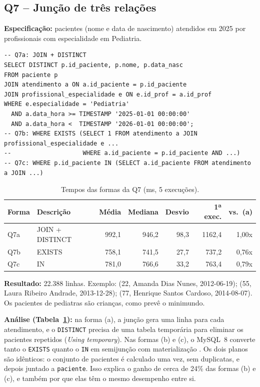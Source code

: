 \documentclass[10pt,a4paper]{article}
\begin{document}
\subsection{Q7 -- Junção de três relações}
\textbf{Especificação:} pacientes (nome e data de nascimento) atendidos em 2025 por profissionais com especialidade em Pediatria.

\begin{lstlisting}
-- Q7a: JOIN + DISTINCT
SELECT DISTINCT p.id_paciente, p.nome, p.data_nasc
FROM paciente p
JOIN atendimento a ON a.id_paciente = p.id_paciente
JOIN profissional_especialidade e ON e.id_prof = a.id_prof
WHERE e.especialidade = 'Pediatria'
  AND a.data_hora >= TIMESTAMP '2025-01-01 00:00:00'
  AND a.data_hora <  TIMESTAMP '2026-01-01 00:00:00';
-- Q7b: WHERE EXISTS (SELECT 1 FROM atendimento a JOIN profissional_especialidade e ...
--                    WHERE a.id_paciente = p.id_paciente AND ...)
-- Q7c: WHERE p.id_paciente IN (SELECT a.id_paciente FROM atendimento a JOIN ...)
\end{lstlisting}

\begin{table}[H]\centering\footnotesize
\caption{Tempos das formas da Q7 (ms, 5 execuções).}\label{tab:q7}
\begin{tabular}{llrrrrr}\toprule
Forma & Descrição & Média & Mediana & Desvio & 1ª exec. & vs.\ (a) \\ \midrule
Q7a & JOIN + DISTINCT  & 992,1 & 946,2 & 98,3 & 1162,4 & 1,00x \\
Q7b & EXISTS           & 758,1 & 741,5 & 27,7 &  737,2 & 0,76x \\
Q7c & IN               & 781,0 & 766,6 & 33,2 &  763,4 & 0,79x \\ \bottomrule
\end{tabular}
\end{table}

\textbf{Resultado:} 22.388 linhas. Exemplo: (22, Amanda Dias Nunes, 2012-06-19); (55, Laura Ribeiro Andrade, 2013-12-28); (77, Henrique Santos Cardoso, 2014-08-07). Os pacientes de pediatras são crianças, como prevê o minimundo.

\textbf{Análise (Tabela~\ref{tab:q7}):} na forma (a), a junção gera uma linha para cada atendimento, e o \texttt{DISTINCT} precisa de uma tabela temporária para eliminar os pacientes repetidos (\emph{Using temporary}). Nas formas (b) e (c), o MySQL~8 converte tanto o \texttt{EXISTS} quanto o \texttt{IN} em semijunção com materialização \cite{mysql-semijoin}. Os dois planos são idênticos: o conjunto de pacientes é calculado uma vez, sem duplicatas, e depois juntado a \texttt{paciente}. Isso explica o ganho de cerca de 24\% das formas (b) e (c), e também por que elas têm o mesmo desempenho entre si.
\end{document}
